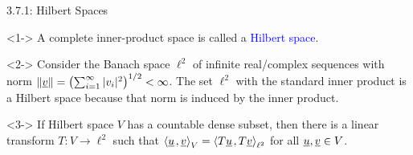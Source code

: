 \documentclass[10pt,english,aspectratio=169]{beamer}
\begin{document}
\begin{frame}{3.7.1: Hilbert Spaces}

\begin{definition}<1->
A complete inner-product space is called a \textcolor{blue}{Hilbert space}.
\end{definition}

\begin{example}<2->
Consider the Banach space $\ell^2$ of infinite real/complex sequences with norm $\|\underline{v}\| = \left( \sum_{i=1}^\infty |v_i|^2 \right)^{1/2} < \infty$.
The set $\ell^2$ with the standard inner product is a Hilbert space  because that norm is induced by the inner product.
\end{example}

\begin{theorem}<3->
If Hilbert space $V$ has a countable dense subset, then there is a linear transform $T:V\to \ell^2$ such that ${\left\langle  \underline{u}  \mskip2mu ,  \underline{v}  \right\rangle}_V = {\left\langle  T\underline{u}  \mskip2mu ,  T\underline{v}  \right\rangle}_{\ell^2}$ for all $\underline{u},\underline{v} \in V$.
\end{theorem}



\end{frame}
\end{document}
